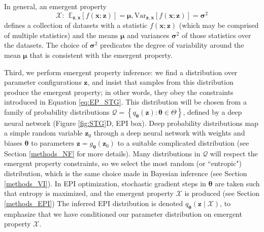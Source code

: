 \documentclass[11pt]{article}
\begin{document}
In general, an emergent property
\begin{equation}\label{eq:EP_STG}
\mathcal{X}:~~ \mathbb{E}_{\mathbf{z},\mathbf{x}}\left[f(\mathbf{x}; \mathbf{z})\right] = \bm{\mu}, \text{Var}_{\mathbf{z},\mathbf{x}}\left[f(\mathbf{x}; \mathbf{z})\right] = \bm{\sigma}^2
\end{equation}
defines a collection of datasets with a statistic $f(\mathbf{x}; \mathbf{z})$ (which may be comprised of multiple statistics) and the means $\bm{\mu}$ and variances $\bm{\sigma}^2$ of those statistics over the datasets.
The choice of $\bm{\sigma}^2$ predicates the degree of variability around the mean $\bm{\mu}$ that is consistent with the emergent property.

Third, we perform emergent property inference: we find a distribution over parameter configurations $\mathbf{z}$, and insist that samples from this distribution produce the emergent property; in other words, they obey the constraints introduced in Equation \ref{eq:EP_STG}.  
This distribution will be chosen from a family of probability distributions $\mathcal{Q} = \left\{ q_{\bm{\theta}}(\mathbf{z}) : \bm{\theta} \in \Theta \right\}$, defined by a deep neural network \cite{rezende2015variational, dinh2017density, papamakarios2017masked} (Figure \ref{fig:STG}D, EPI box).
Deep probability distributions map a simple random variable $\mathbf{z}_0$ through a deep neural network with weights and biases $\bm{\theta}$ to parameters $\mathbf{z} = g_{\bm{\theta}}(\mathbf{z}_0)$ to a suitable complicated distribution (see Section \ref{methods_NF} for more details).
Many distributions in $\mathcal{Q}$ will respect the emergent property constraints, so we select the most random (or ``entropic") distribution, which is the same choice made in Bayesian inference (see Section \ref{methods_VI}).
In EPI optimization, stochastic gradient steps in $\bm{\theta}$ are taken such that entropy is maximized, and the emergent property $\mathcal{X}$ is produced (see Section \ref{methods_EPI})
The inferred EPI distribution is denoted $q_{\bm{\theta}}(\mathbf{z} \mid \mathcal{X})$, to emphasize that we have conditioned our parameter distribution on emergent property $\mathcal{X}$.
\end{document}
